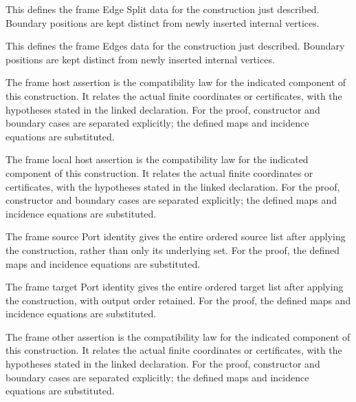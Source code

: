 This defines the frame Edge Split data for the construction just described. Boundary positions are kept distinct from newly inserted internal vertices.
\par{}

This defines the frame Edges data for the construction just described. Boundary positions are kept distinct from newly inserted internal vertices.
\par{}

The frame host assertion is the compatibility law for the indicated component of this construction. It relates the actual finite coordinates or certificates, with the hypotheses stated in the linked declaration.
For the proof, constructor and boundary cases are separated explicitly; the defined maps and incidence equations are substituted.
\par{}

The frame local host assertion is the compatibility law for the indicated component of this construction. It relates the actual finite coordinates or certificates, with the hypotheses stated in the linked declaration.
For the proof, constructor and boundary cases are separated explicitly; the defined maps and incidence equations are substituted.
\par{}

The frame source Port identity gives the entire ordered source list after applying the construction, rather than only its underlying set.
For the proof, the defined maps and incidence equations are substituted.
\par{}

The frame target Port identity gives the entire ordered target list after applying the construction, with output order retained.
For the proof, the defined maps and incidence equations are substituted.
\par{}

The frame other assertion is the compatibility law for the indicated component of this construction. It relates the actual finite coordinates or certificates, with the hypotheses stated in the linked declaration.
For the proof, constructor and boundary cases are separated explicitly; the defined maps and incidence equations are substituted.
\par{}

